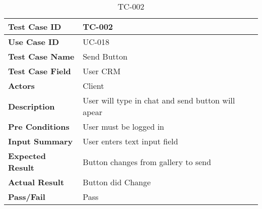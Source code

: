 
\begin{table}[h]
    \centering
    \caption{TC-002}
    \begin{tabular}{ |p{3.8cm}|p{8cm}| }
        \hline
        \textbf{Test Case ID}    & TC-002                                            \\
        \hline
        \textbf{Use Case ID}     & UC-018                                            \\
        \hline
        \textbf{Test Case Name}  & Send Button                                       \\
        \hline
        \textbf{Test Case Field} & User CRM                                          \\
        \hline
        \textbf{Actors}          & Client                                            \\
        \hline
        \textbf{Description}     & User will type in chat and send button will apear \\
        \hline
        \textbf{Pre Conditions}  & User must be logged in                            \\
        \hline
        \textbf{Input Summary}   & User enters text input field                      \\
        \hline
        \textbf{Expected Result} & Button changes from gallery to send               \\
        \hline
        \textbf{Actual Result}   & Button did Change                                 \\
        \hline
        \textbf{Pass/Fail}       & Pass                                              \\
        \hline
    \end{tabular}
\end{table}